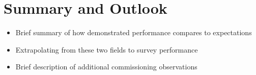 




\section{Summary and Outlook}

\begin{itemize}

\item Brief summary of how demonstrated performance compares to expectations

\item Extrapolating from these two fields to survey performance

\item Brief description of additional commissioning observations 

\end{itemize}
